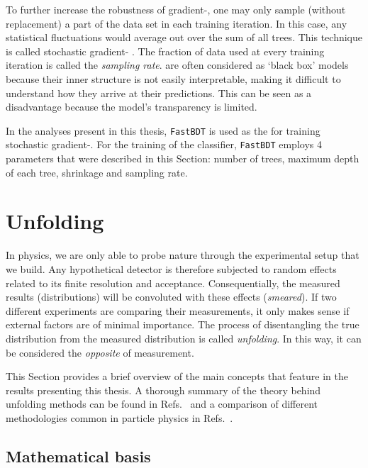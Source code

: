 To further increase the robustness of gradient-, one may only sample (without replacement) a part of the data set in each training iteration.
In this case, any statistical fluctuations would average out over the sum of all trees. 
This technique is called stochastic gradient- \cite{FRIEDMAN2002367}.
The fraction of data used at every training iteration is called the \textit{sampling rate}.
 are often considered as `black box' models because their inner structure is
not easily interpretable, making it difficult to understand how they arrive at their predictions. 
This can be seen as a disadvantage because the model's transparency is limited.

In the analyses present in this thesis, \texttt{FastBDT} \cite{Keck:2017gsv} is used as the \MVA for training stochastic gradient-.
For the training of the classifier, \texttt{FastBDT} employs 4 parameters that were described in this Section: number of trees, maximum depth of each tree, shrinkage and sampling rate. 

\section{Unfolding}\label{sec:unfolding}

In physics, we are only able to probe nature through the experimental setup that we build.
Any hypothetical detector is therefore subjected to random effects related to its finite resolution and acceptance.
Consequentially, the measured results (distributions) will be convoluted with these effects (\textit{smeared}).
If two different experiments are comparing their measurements, it only makes sense if external factors are of minimal importance.
The process of disentangling the true distribution from the measured distribution is called \textit{unfolding}.
In this way, it can be considered the \textit{opposite} of measurement.

This Section provides a brief overview of the main concepts that feature in the results presenting this thesis.
A thorough summary of the theory behind unfolding methods can be found in Refs.~\cite{Behnke:2013pga,Blobel_Lohrmann_1998} and a comparison of different methodologies common in particle physics in Refs.~\cite{Schmitt:2016orm,Cowan:2002in,Brenner:2019lmf}.

\subsection{Mathematical basis}

